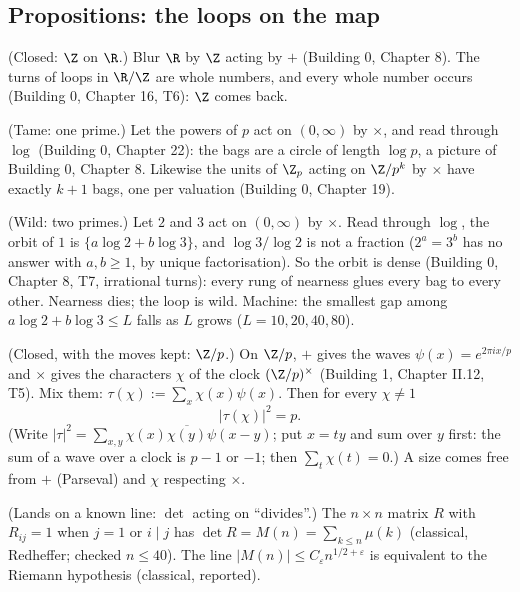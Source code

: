 \subsection*{Propositions: the loops on the map}

\begin{lines}
\item[\lab{P1}] (Closed: $\Z$ on $\R$.) Blur $\R$ by $\Z$ acting by $+$ (Building 0, Chapter 8). The turns of loops in $\R/\Z$ are whole numbers, and every whole number occurs (Building 0, Chapter 16, T6): $\Z$ comes back.
\item[\lab{P2}] (Tame: one prime.) Let the powers of $p$ act on $(0, \infty)$ by $\times$, and read through $\log$ (Building 0, Chapter 22): the bags are a circle of length $\log p$, a picture of Building 0, Chapter 8. Likewise the units of $\Z_p$ acting on $\Z/p^k$ by $\times$ have exactly $k + 1$ bags, one per valuation (Building 0, Chapter 19).
\item[\lab{P3}] (Wild: two primes.) Let $2$ and $3$ act on $(0, \infty)$ by $\times$. Read through $\log$, the orbit of $1$ is $\{a \log 2 + b \log 3\}$, and $\log 3 / \log 2$ is not a fraction ($2^a = 3^b$ has no answer with $a, b \ge 1$, by unique factorisation). So the orbit is dense (Building 0, Chapter 8, T7, irrational turns): every rung of nearness glues every bag to every other. Nearness dies; the loop is wild. Machine: the smallest gap among $a \log 2 + b \log 3 \le L$ falls as $L$ grows ($L = 10, 20, 40, 80$).
\item[\lab{P4}] (Closed, with the moves kept: $\Z/p$.) On $\Z/p$, $+$ gives the waves $\psi(x) = e^{2\pi i x/p}$ and $\times$ gives the characters $\chi$ of the clock $(\Z/p)^\times$ (Building 1, Chapter II.12, T5). Mix them: $\tau(\chi) := \sum_x \chi(x) \psi(x)$. Then for every $\chi \ne 1$ \[ |\tau(\chi)|^2 = p . \] (Write $|\tau|^2 = \sum_{x, y} \chi(x)\overline{\chi(y)} \psi(x - y)$; put $x = ty$ and sum over $y$ first: the sum of a wave over a clock is $p - 1$ or $-1$; then $\sum_t \chi(t) = 0$.) A size comes free from $+$ (Parseval) and $\chi$ respecting $\times$.
\item[\lab{P5}] (Lands on a known line: $\det$ acting on ``divides''.) The $n \times n$ matrix $R$ with $R_{ij} = 1$ when $j = 1$ or $i \mid j$ has $\det R = M(n) = \sum_{k \le n} \mu(k)$ (classical, Redheffer; checked $n \le 40$). The line $|M(n)| \le C_\varepsilon n^{1/2 + \varepsilon}$ is equivalent to the Riemann hypothesis (classical, reported).
\end{lines}

